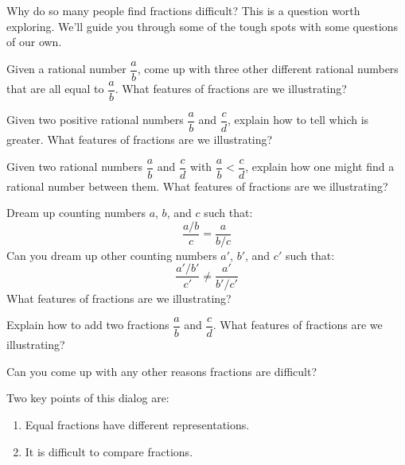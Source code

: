 Why do so many people find fractions difficult? This is a question
worth exploring. We'll guide you through some of the tough spots with
some questions of our own.

\begin{question}
Given a rational number $\dfrac{a}{b}$, come up with three other different rational numbers
that are all equal to $\dfrac{a}{b}$. What features of fractions are we
illustrating?
\end{question}
\QM

\begin{question}
Given two positive rational numbers $\dfrac{a}{b}$ and $\dfrac{c}{d}$, explain how to tell which is greater. What features of fractions are we illustrating?
\end{question}
\QM

\begin{question} 
Given two rational numbers $\dfrac{a}{b}$ and $\dfrac{c}{d}$ with $\dfrac{a}{b} < \dfrac{c}{d}$, explain how one
might find a rational number between them. What features of fractions are we
illustrating?
\end{question}
\QM


\begin{question} 
Dream up counting numbers $a$, $b$, and $c$ such that:
\[
\frac{a/b}{c} = \frac{a}{b/c}
\]
Can you dream up other counting numbers $a'$, $b'$, and $c'$ such that:
\[
\frac{a'/b'}{c'} \neq \frac{a'}{b'/c'}
\]
What features of fractions are we illustrating?
\end{question}
\QM

\begin{question}
Explain how to add two fractions $\dfrac{a}{b}$ and $\dfrac{c}{d}$. What features of
fractions are we illustrating?
\end{question}
\QM


\begin{question} 
Can you come up with any other reasons fractions are difficult?
\end{question}
\QM

\begin{teachingnote}
Two key points of this dialog are: 
\begin{enumerate}
\item Equal fractions have different representations. 
\item It is difficult to compare fractions. 
\end{enumerate}
\end{teachingnote}




